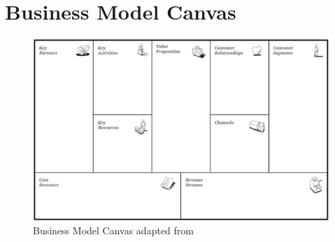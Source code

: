 \chapter{Business Model Canvas}\label{ch:app03}

\begin{figure}[htb]
	\centering
	\includegraphics[width=\textwidth]{gfx/businessModelCanvas}
	\caption[Business Model Canvas]{Business Model Canvas adapted from \citet[p. 44]{Osterwalder2010}}
	\label{fig:bmc}
\end{figure}